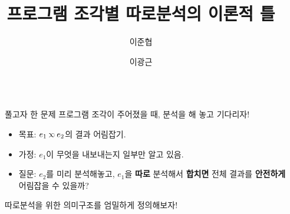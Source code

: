 \documentclass[final]{beamer}
\title{프로그램 조각별 따로분석의 이론적 틀}
\author{이준협 \and 이광근}
\institute[shortinst]{서울대학교 프로그래밍 연구실 (ROPAS)}
\newcommand*{\semlink}{\mathbin{\rotatebox[origin=c]{180}{$\propto$}}}
\newcommand*{\link}[2]{{#1}\semlink{#2}}
\newlength{\sepwidth}
\newlength{\colwidth}
\newcommand{\separatorcolumn}{\begin{column}{\sepwidth}\end{column}}
\begin{document}
\begin{frame}[t]
  \begin{columns}[t]
    \separatorcolumn

    \begin{column}{\colwidth}
      \begin{block}{풀고자 한 문제}
        프로그램 조각이 주어졌을 때, 분석을 해 놓고 기다리자!
        \begin{itemize}
          \item 목표: $\link{e_1}{e_2}$의 결과 어림잡기.
          \item 가정: $e_1$이 무엇을 내보내는지 일부만 알고 있음.
          \item 질문: $e_2$를 미리 분석해놓고, $e_1$을 \textbf{따로} 분석해서 \textbf{합치면} 전체 결과를 \textbf{안전하게} 어림잡을 수 있을까?
        \end{itemize}
        따로분석을 위한 의미구조를 엄밀하게 정의해보자!
      \end{block}


\end{column}
\end{columns}
\end{frame}
\end{document}
